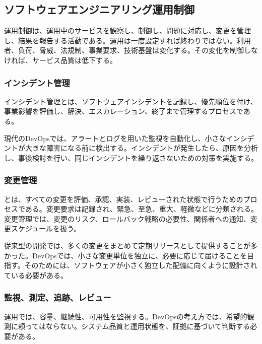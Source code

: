 \documentclass[a4paper,11pt]{ltjsarticle}
\numberwithin{figure}{section}
\numberwithin{table}{section}
\begin{document}
\subsection{ソフトウェアエンジニアリング運用制御}

運用制御は、運用中のサービスを観察し、制御し、問題に対応し、変更を管理し、結果を報告する活動である。運用は一度設定すれば終わりではない。利用者、負荷、脅威、法規制、事業要求、技術基盤は変化する。その変化を制御しなければ、サービス品質は低下する。

\subsubsection{インシデント管理}

インシデント管理とは、ソフトウェアインシデントを記録し、優先順位を付け、事業影響を評価し、解決、エスカレーション、終了まで管理するプロセスである。

現代のDevOpsでは、アラートとログを用いた監視を自動化し、小さなインシデントが大きな障害になる前に検出する。インシデントが発生したら、原因を分析し、事後検討を行い、同じインシデントを繰り返さないための対策を実施する。

\subsubsection{変更管理}

とは、すべての変更を評価、承認、実装、レビューされた状態で行うためのプロセスである。変更要求は記録され、緊急、至急、重大、軽微などに分類される。変更管理では、変更のリスク、ロールバック戦略の必要性、関係者への通知、変更スケジュールを扱う。

従来型の開発では、多くの変更をまとめて定期リリースとして提供することが多かった。DevOpsでは、小さな変更単位を独立に、必要に応じて届けることを目指す。そのためには、ソフトウェアが小さく独立した配備に向くように設計されている必要がある。

\subsubsection{監視、測定、追跡、レビュー}

運用では、容量、継続性、可用性を監視する。DevOpsの考え方では、希望的観測に頼ってはならない。システム品質と運用状態を、証拠に基づいて判断する必要がある。
\end{document}
